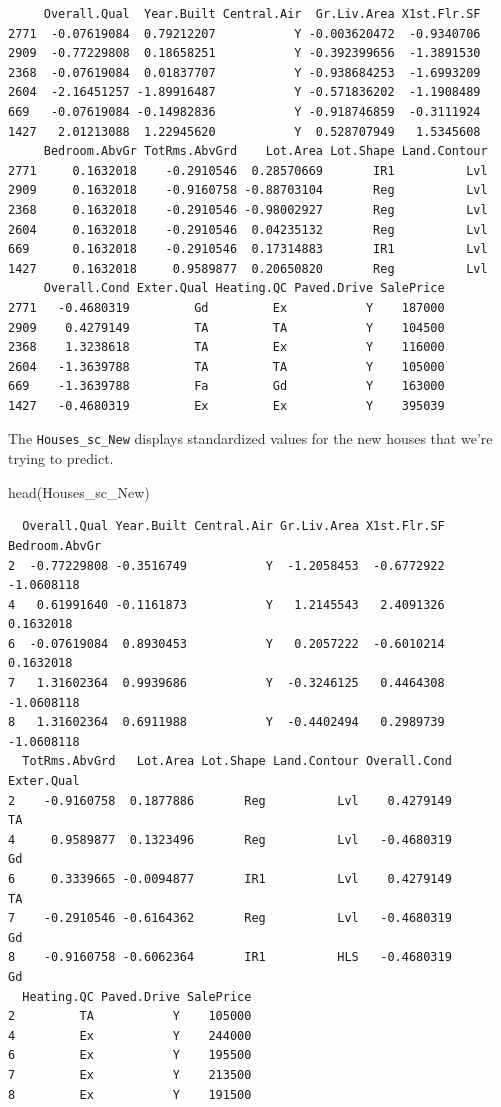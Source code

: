 \documentclass[
  letterpaper,
  DIV=11,
  numbers=noendperiod]{scrreprt}
\newenvironment{Shaded}{\begin{snugshade}}{\end{snugshade}}
\newcommand{\FunctionTok}[1]{\textcolor[rgb]{0.28,0.35,0.67}{#1}}
\newcommand{\NormalTok}[1]{\textcolor[rgb]{0.00,0.23,0.31}{#1}}
\begin{document}
\begin{verbatim}
     Overall.Qual  Year.Built Central.Air  Gr.Liv.Area X1st.Flr.SF
2771  -0.07619084  0.79212207           Y -0.003620472  -0.9340706
2909  -0.77229808  0.18658251           Y -0.392399656  -1.3891530
2368  -0.07619084  0.01837707           Y -0.938684253  -1.6993209
2604  -2.16451257 -1.89916487           Y -0.571836202  -1.1908489
669   -0.07619084 -0.14982836           Y -0.918746859  -0.3111924
1427   2.01213088  1.22945620           Y  0.528707949   1.5345608
     Bedroom.AbvGr TotRms.AbvGrd    Lot.Area Lot.Shape Land.Contour
2771     0.1632018    -0.2910546  0.28570669       IR1          Lvl
2909     0.1632018    -0.9160758 -0.88703104       Reg          Lvl
2368     0.1632018    -0.2910546 -0.98002927       Reg          Lvl
2604     0.1632018    -0.2910546  0.04235132       Reg          Lvl
669      0.1632018    -0.2910546  0.17314883       IR1          Lvl
1427     0.1632018     0.9589877  0.20650820       Reg          Lvl
     Overall.Cond Exter.Qual Heating.QC Paved.Drive SalePrice
2771   -0.4680319         Gd         Ex           Y    187000
2909    0.4279149         TA         TA           Y    104500
2368    1.3238618         TA         Ex           Y    116000
2604   -1.3639788         TA         TA           Y    105000
669    -1.3639788         Fa         Gd           Y    163000
1427   -0.4680319         Ex         Ex           Y    395039
\end{verbatim}

The \texttt{Houses\_sc\_New} displays standardized values for the new
houses that we're trying to predict.

\begin{Shaded}
\begin{Highlighting}[]
\FunctionTok{head}\NormalTok{(Houses\_sc\_New)}
\end{Highlighting}
\end{Shaded}

\begin{verbatim}
  Overall.Qual Year.Built Central.Air Gr.Liv.Area X1st.Flr.SF Bedroom.AbvGr
2  -0.77229808 -0.3516749           Y  -1.2058453  -0.6772922    -1.0608118
4   0.61991640 -0.1161873           Y   1.2145543   2.4091326     0.1632018
6  -0.07619084  0.8930453           Y   0.2057222  -0.6010214     0.1632018
7   1.31602364  0.9939686           Y  -0.3246125   0.4464308    -1.0608118
8   1.31602364  0.6911988           Y  -0.4402494   0.2989739    -1.0608118
  TotRms.AbvGrd   Lot.Area Lot.Shape Land.Contour Overall.Cond Exter.Qual
2    -0.9160758  0.1877886       Reg          Lvl    0.4279149         TA
4     0.9589877  0.1323496       Reg          Lvl   -0.4680319         Gd
6     0.3339665 -0.0094877       IR1          Lvl    0.4279149         TA
7    -0.2910546 -0.6164362       Reg          Lvl   -0.4680319         Gd
8    -0.9160758 -0.6062364       IR1          HLS   -0.4680319         Gd
  Heating.QC Paved.Drive SalePrice
2         TA           Y    105000
4         Ex           Y    244000
6         Ex           Y    195500
7         Ex           Y    213500
8         Ex           Y    191500
\end{verbatim}
\end{document}
